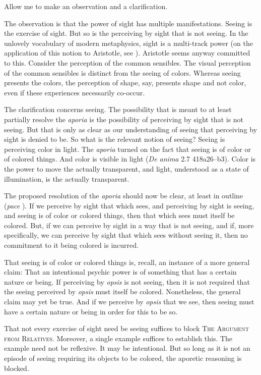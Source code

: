 Allow me to make an observation and a clarification.

The observation is that the power of sight has multiple manifestations. Seeing is the exercise of sight. But so is the perceiving by sight that is not seeing. In the unlovely vocabulary of modern metaphysics, sight is a multi-track power (on the application of this notion to Aristotle, see \citealt[3.1.2]{Marmodoro:2014br}). Aristotle seems anyway committed to this. Consider the perception of the common sensibles. The visual perception of the common sensibles is distinct from the seeing of colors. Whereas seeing presents the colors, the perception of shape, say, presents shape and not color, even if these experiences necessarily co-occur.

The clarification concerns seeing. The possibility that is meant to at least partially resolve the \emph{aporia} is the possibility of perceiving by sight that is not seeing. But that is only as clear as our understanding of seeing that perceiving by sight is denied to be. So what is the relevant notion of seeing? Seeing is perceiving color in light. The \emph{aporia} turned on the fact that seeing is of color or of colored things. And color is visible in light (\emph{De anima} 2.7 418a26–b3). Color is the power to move the actually transparent, and light, understood as a state of illumination, is the actually transparent.

The proposed resolution of the \emph{aporia} should now be clear, at least in outline (\emph{pace} \citealt[122]{Hamlyn:2002ys}). If we perceive by sight that which sees, and perceiving by sight is seeing, and seeing is of color or colored things, then that which sees must itself be colored. But, if we can perceive by sight in a way that is not seeing, and if, more specifically, we can perceive by sight that which sees without seeing it, then no commitment to it being colored is incurred.

That seeing is of color or colored things is, recall, an instance of a more general claim: That an intentional psychic power is of something that has a certain nature or being. If perceiving by \emph{opsis} is not seeing, then it is not required that the seeing perceived by \emph{opsis} must itself be colored. Nonetheless, the general claim may yet be true. And if we perceive by \emph{opsis} that we see, then seeing must have a certain nature or being in order for this to be so.

That not every exercise of sight need be seeing suffices to block \textsc{The Argument from Relatives}. Moreover, a single example suffices to establish this. The example need not be reflexive. It may be intentional. But so long as it is not an episode of seeing requiring its objects to be colored, the aporetic reasoning is blocked.

